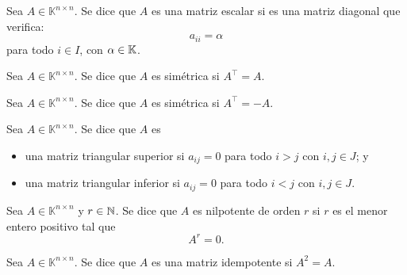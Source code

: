 \documentclass[a4,11pt]{aleph-notas}
\begin{document}
\begin{defi}
    Sea $A\in \mathbb{K}^{n \times n}$. Se dice que $A$ es una matriz escalar si es una matriz diagonal que verifica:
    \[ 
        a_{ii} = \alpha
    \]
    para todo $i\in I$, con $\alpha\in\mathbb{K}$.
\end{defi}

\begin{defi}
    Sea $A\in \mathbb{K}^{n \times n}$. Se dice que $A$ es simétrica si $A^\intercal = A$.
\end{defi}

\begin{defi}
    Sea $A\in \mathbb{K}^{n \times n}$. Se dice que $A$ es simétrica si $A^\intercal = -A$.
\end{defi}

\begin{defi}
    Sea $A\in \mathbb{K}^{n \times n}$. Se dice que $A$ es
    \begin{itemize}
    \item 
        una matriz triangular superior si $a_{ij} = 0 $ para todo $i>j$ con $i,j \in J$; y
    \item 
        una matriz triangular inferior si $a_{ij} = 0 $ para todo $i<j$ con $i,j \in J$.
    \end{itemize}
\end{defi}

\begin{defi}
    Sea $A\in \mathbb{K}^{n \times n}$ y $r \in \mathbb{N}$. Se dice que $A$ es nilpotente de orden $r$ si $r$ es el menor entero positivo tal que
    \[ 
        A^r = 0.
    \]
\end{defi}

\begin{defi}
    Sea $A\in \mathbb{K}^{n \times n}$. Se dice que $A$ es una matriz idempotente si $A^2 = A$.
\end{defi}

\end{document}
